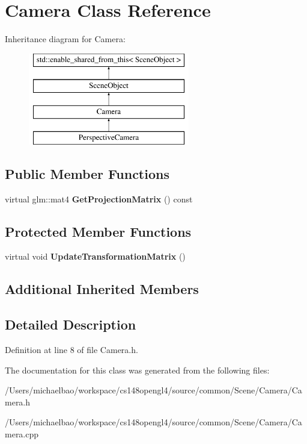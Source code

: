 \hypertarget{class_camera}{}\section{Camera Class Reference}
\label{class_camera}
Inheritance diagram for Camera\+:\begin{figure}[H]
\begin{center}
\leavevmode
\includegraphics[height=4.000000cm]{class_camera}
\end{center}
\end{figure}
\subsection*{Public Member Functions}
\begin{DoxyCompactItemize}
\item 
\hypertarget{class_camera_a497efa3119ab4ae679d29badf6f25682}{}virtual glm\+::mat4 {\bfseries Get\+Projection\+Matrix} () const \label{class_camera_a497efa3119ab4ae679d29badf6f25682}

\end{DoxyCompactItemize}
\subsection*{Protected Member Functions}
\begin{DoxyCompactItemize}
\item 
\hypertarget{class_camera_aea640c892a3807671d8ca49616d96eda}{}virtual void {\bfseries Update\+Transformation\+Matrix} ()\label{class_camera_aea640c892a3807671d8ca49616d96eda}

\end{DoxyCompactItemize}
\subsection*{Additional Inherited Members}


\subsection{Detailed Description}


Definition at line 8 of file Camera.\+h.



The documentation for this class was generated from the following files\+:\begin{DoxyCompactItemize}
\item 
/\+Users/michaelbao/workspace/cs148opengl4/source/common/\+Scene/\+Camera/Camera.\+h\item 
/\+Users/michaelbao/workspace/cs148opengl4/source/common/\+Scene/\+Camera/Camera.\+cpp\end{DoxyCompactItemize}
